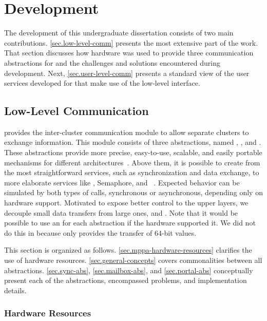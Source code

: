 \chapter{Development}
\label{ch.development}

	The development of this undergraduate dissertation consists of two main contributions.
	\autoref{sec.low-level-comm} presents the most extensive part of the work. That section
	discusses how \mppa hardware was used to provide three communication abstractions for
	\nanvix \textit{\hal} and the challenges and solutions encountered during development.
	Next, \autoref{sec.user-level-comm} presents a standard view of the user services
	developed for \nanvix \microkernel that make use of the low-level interface.

	\section{Low-Level Communication}
	\label{sec.low-level-comm}

		\nanvix \textit{\hal} provides the inter-cluster communication module to allow separate
		clusters to exchange information.
		This module consists of three abstractions, named \sync, \mailbox, and \portal.
		These abstractions provide more precise, easy-to-use, scalable, and easily
		portable mechanisms for different architectures~\cite{wentzlaff_fleets:_2011}.
		Above them, it is possible to create from the most straightforward services, such
		as synchronization and data exchange, to more elaborate services
		like \shm, \posix Semaphore, and \rmem~\cite{penna:rmen}.
		Expected behavior can be simulated by both types of calls, synchronous or
		asynchronous, depending only on hardware support.
		Motivated to expose better \qos control to the upper layers, we decouple small data
		transfers from large ones, \ie \mailbox and \portal.
		Note that it would be possible to use an \noc for each abstraction if the hardware supported it.
		We did not do this in \mppa because \cnoc only provides the transfer of 64-bit values.
		
		This section is organized as follows.
		\autoref{sec.mppa-hardware-resources} clarifies the use of \mppa hardware resources.
		\autoref{sec.general-concepts} covers commonalities between all abstractions.
		\autoref{sec.sync-abs},
		\autoref{sec.mailbox-abs}, and
		\autoref{sec.portal-abs}
		conceptually present each of the abstractions, encompassed problems, and 
		implementation details.

		\subsection{\mppa Hardware Resources}
		\label{sec.mppa-hardware-resources}

